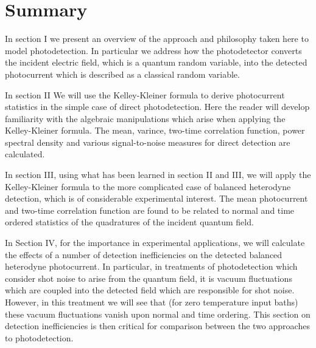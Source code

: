 \documentclass[12pt]{article}
\begin{document}


\section*{Summary}
In section I we present an overview of the approach and philosophy taken here to model photodetection. In particular we address how the photodetector converts the incident electric field, which is a quantum random variable, into the detected photocurrent which is described as a classical random variable.

In section II We will use the Kelley-Kleiner formula to derive photocurrent statistics in the simple case of direct photodetection. Here the reader will develop familiarity with the algebraic manipulations which arise when applying the Kelley-Kleiner formula. The mean, varince, two-time correlation function, power spectral density and various signal-to-noise measures for direct detection are calculated.

In section III, using what has been learned in section II and III, we will apply the Kelley-Kleiner formula to the more complicated case of balanced heterodyne detection, which is of considerable experimental interest. The mean photocurrent and two-time correlation function are found to be related to normal and time ordered statistics of the quadratures of the incident quantum field. 

In Section IV, for the importance in experimental applications, we will calculate the effects of a number of detection inefficiencies on the detected balanced heterodyne photocurrent. In particular, in treatments of photodetection which consider shot noise to arise from the quantum field, it is vacuum fluctuations which are coupled into the detected field which are responsible for shot noise. However, in this treatment we will see that (for zero temperature input baths) these vacuum fluctuations vanish upon normal and time ordering. This section on detection inefficiencies is then critical for comparison between the two approaches to photodetection.
\end{document}
